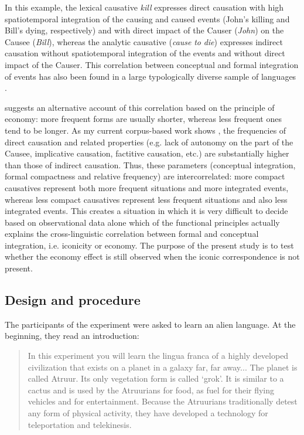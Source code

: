 \documentclass[output=paper]{langsci/langscibook}
\begin{document}
In this example, the lexical causative \textit{kill} expresses direct causation with high spatiotemporal integration of the causing and caused events (John’s killing and Bill’s dying, respectively) and with direct impact of the Causer (\textit{John}) on the Causee (\textit{Bill}), whereas the analytic causative (\textit{cause} \textit{to} \textit{die}) expresses indirect causation without spatiotemporal integration of the events and without direct impact of the Causer. This correlation between conceptual and formal integration of events has also been found in a large typologically diverse sample of languages \citep{Levshina2017}.

\citet{Haspelmath2008} suggests an alternative account of this correlation based on the principle of economy: more frequent forms are usually shorter, whereas less frequent ones tend to be longer. As my current corpus-based work shows \citep{Levshina2016}, the frequencies of direct causation and related properties (e.g. lack of autonomy on the part of the Causee, implicative causation, factitive causation, etc.) are substantially higher than those of indirect causation. Thus, these parameters (conceptual integration, formal compactness and relative frequency) are intercorrelated: more compact causatives represent both more frequent situations and more integrated events, whereas less compact causatives represent less frequent situations and also less integrated events. This creates a situation in which it is very difficult to decide based on observational data alone which of the functional principles actually explains the cross-linguistic correlation between formal and conceptual integration, i.e. iconicity or economy. The purpose of the present study is to test whether the economy effect is still observed when the iconic correspondence is not present. 

\subsection{Design and procedure}

The participants of the experiment were asked to learn an alien language. At the beginning, they read an introduction:

\begin{quote}
In this experiment you will learn the lingua franca of a highly developed civilization that exists on a planet in a galaxy far, far away...  The planet is called Atruur. Its only vegetation form is called ‘grok’. It is similar to a cactus and is used by the Atruurians for food, as fuel for their flying vehicles and for entertainment. Because the Atruurians traditionally detest any form of physical activity, they have developed a technology for teleportation and telekinesis.
\end{quote}
\end{document}
